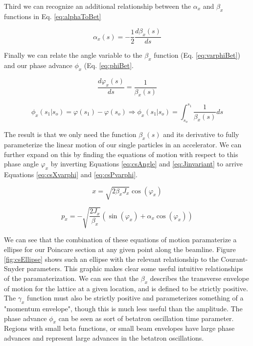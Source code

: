 Third we can recognize an additional relationship between the $\alpha_x$ and $\beta_x$ functions in Eq. \ref{eq:alphaToBet}

\begin{equation} \label{eq:alphaToBet}
	\alpha_x(s) = -\frac{1}{2}\frac{d\beta_x(s)}{ds}
\end{equation}

Finally we can relate the angle variable to the $\beta_x$ function (Eq. \ref{eq:varphiBet}) and our phase advance $\phi_x$ (Eq. \ref{eq:phiBet}.

\begin{equation} \label{eq:varphiBet}
	\frac{d\varphi_x(s)}{ds} = \frac{1}{\beta_x(s)}
\end{equation}

\begin{equation} \label{eq:phiBet}
	\phi_x(s_1|s_o) = \varphi(s_1) - \varphi(s_o) \Rightarrow \phi_x(s_1|s_o) = \int_{s_o}^{s_1} \frac{1}{\beta_x(s)} ds
\end{equation}

The result is that we only need the function $\beta_x(s)$ and its derivative to fully parameterize the linear motion of our single particles in an accelerator. We can further expand on this by finding the equations of motion with respect to this phase angle $\varphi_x$ by inverting Equations \ref{eq:csAngle} and \ref{eq:Jinvariant} to arrive Equations \ref{eq:csXvarphi} and \ref{eq:csPvarphi}.

\begin{equation} \label{eq:csXvarphi}
	x = \sqrt{2 \beta_x J_x} \cos{(\varphi_x)}
\end{equation}

\begin{equation} \label{eq:csPvarphi}
	p_x = -\sqrt{\frac{2 J_x}{\beta_x}} (\sin{(\varphi_x)} + \alpha_x \cos{(\varphi_x)})
\end{equation}

We can see that the combination of these equations of motion paramaterize a ellipse for our Poincare section at any given point along the beamline. Figure \ref{fig:csEllipse} shows such an ellipse with the relevant relationship to the Courant-Snyder parameters. This graphic makes clear some useful intuitive relationships of the paramaterization. We can see that the $\beta_x$ describes the transverse envelope of motion for the lattice at a given location, and is defined to be strictly positive. The $\gamma_x$ function must also be strictly positive and parameterizes something of a "momentum envelope", though this is much less useful than the amplitude. The phase advance $\phi_x$ can be seen as sort of betatron oscillation time parameter. Regions with small beta functions, or small beam envelopes have large phase advances and represent large advances in the betatron oscillations.

